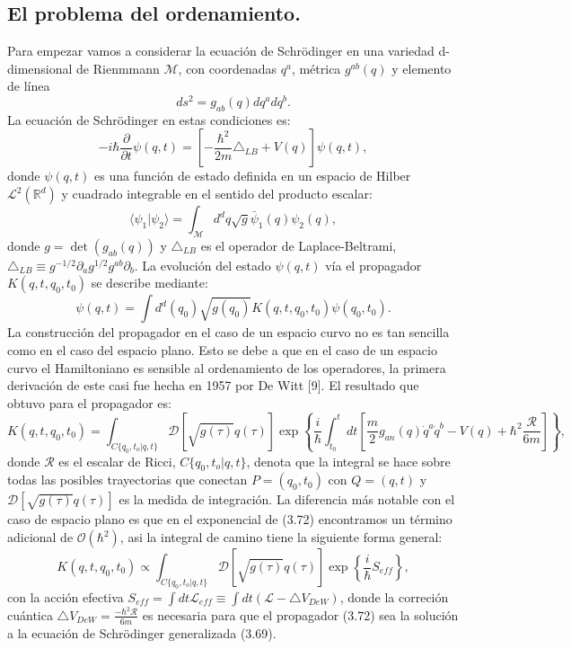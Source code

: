 \subsection{El problema del ordenamiento.}
Para empezar vamos a considerar la ecuación de Schrödinger en una variedad d-dimensional de Rienmmann $\mathcal{M}$, con coordenadas $q^a$, métrica $g^{ab}(q)$ y elemento de línea
\begin{equation}
ds^2=g_{ab}(q)dq^adq^b.
\end{equation}	
La ecuación de Schrödinger en estas condiciones es:
\begin{equation}
-i\hbar\frac{\partial}{\partial t}\psi(q,t)=\left[-\frac{\hbar^{2}}{2m}\triangle_{LB}+V(q)\right]\psi(q,t),
\end{equation}
donde $\psi(q,t)$ es una función de estado definida en un espacio de Hilber $\mathcal{L}^2(\mathbb{R}^d)$ y cuadrado integrable en el sentido del producto escalar:
\begin{equation}
\langle\psi_{1}|\psi_{2}\rangle=\int_{\mathcal{M}}d^{d}q\sqrt{g}\bar{\psi}_{1}(q)\psi_{2}(q),
\end{equation}
donde $g=\det (g_{ab}(q))$ y $\triangle_{LB}$ es el operador de Laplace-Beltrami, $\triangle_{LB}\equiv g^{-1/2}\partial_{a}g^{1/2}g^{ab}\partial_{b}$.
La evolución del estado $\psi(q,t)$ vía el propagador $K(q,t,q_0,t_0)$ se describe mediante:
\begin{equation}
\psi(q,t)=\int d^{d}(q_{0})\sqrt{g(q_{0})}K(q,t,q_{0},t_{0})\psi(q_{0},t_{0}).
\end{equation}
La construcción del propagador en el caso de un espacio curvo no es tan sencilla como en el caso del espacio plano. Esto se debe a que en el caso de un espacio curvo el Hamiltoniano es sensible al ordenamiento de los operadores, la primera derivación de este casi fue hecha en 1957 por De Witt [9]. El resultado que obtuvo para el propagador es:
\begin{equation}
K(q,t,q_{0},t_{0})=\int_{C\{q_{0},t_{o}|q,t\}}\mathcal{D}[\sqrt{g(\tau)}q(\tau)]\exp\left\{ \frac{i}{\hbar}\int_{t_{0}}^{t}dt\left[\frac{m}{2}g_{an}(q)\dot{q}^{a}\dot{q}^{b}-V(q)+\hbar^{2}\frac{\mathcal{R}}{6m}\right]\right\}, 
\end{equation}
donde $\mathcal{R}$ es el escalar de Ricci, ${C\{q_{0},t_{o}|q,t\}}$, denota que la integral se hace sobre todas las posibles trayectorias que conectan $P=(q_0,t_0)$ con $Q=(q,t)$ y $\mathcal{D}[\sqrt{g(\tau)}q(\tau)]$ es la medida de integración. La diferencia más notable con el caso de espacio plano es que en el exponencial de (3.72) encontramos un término adicional de $\mathcal{O}(\hbar^2)$, asi la integral de camino tiene la siguiente forma general:
\begin{equation}
K(q,t,q_{0},t_{0})\propto\int_{C\{q_{0},t_{o}|q,t\}}\mathcal{D}[\sqrt{g(\tau)}q(\tau)]\exp\left\{ \frac{i}{\hbar}S_{eff}\right\} ,
\end{equation}
con la acción efectiva $S_{eff}=\int dt\mathcal{L}_{eff}\equiv\int dt(\mathcal{L}-\triangle V_{DeW})$, donde la correción cuántica $\triangle V_{DeW}=\frac{-\hbar^2\mathcal{R}}{6m}$ es necesaria para que el propagador (3.72) sea la solución a la ecuación de Schrödinger generalizada (3.69).

